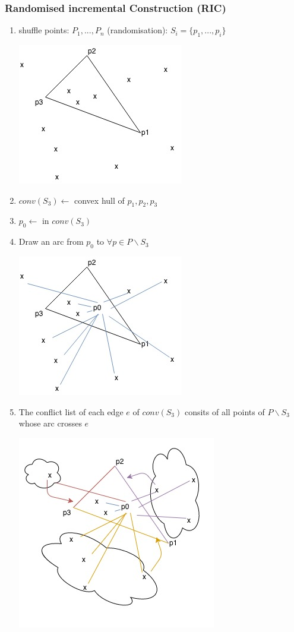 \subsubsection{Randomised incremental Construction (RIC)}
\begin{enumerate}
	\item shuffle points: $P_1,...,P_n$ (randomisation): $S_i = \{p_1,...,p_i\}$ \\
	\begin{center}
		\includegraphics[scale=0.5]{img/convex4} 
	\end{center}
	\item $conv(S_3) \leftarrow$ convex hull of $p_1,p_2,p_3$ 
	\item $p_0 \leftarrow$ in $conv(S_3)$
	\item Draw an arc from $p_0$ to $\forall p \in P \backslash S_3$
	\begin{center}
		\includegraphics[scale=0.5]{img/convex5} 
	\end{center}
\item The conflict list of each edge $e$ of $conv(S_3)$ consits of all points of $P \backslash S_3$ whose arc crosses $e$ 
\begin{center}
	\includegraphics[scale=0.5]{img/convex6} 

\end{center}
\end{enumerate}
